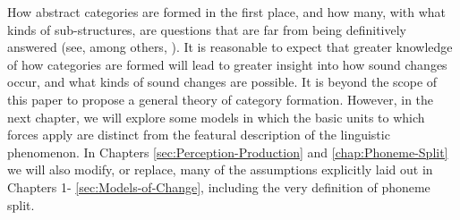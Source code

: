 How abstract categories are formed in the first place, and how many,
with what kinds of sub-structures, are questions that are far from
being definitively answered (see, among others, \citet{Peperkamp2006,dillon2013single,feldman2009learning,mcmurray2011information,goldsmith2009learning}).
It is reasonable to expect that greater knowledge of how categories
are formed will lead to greater insight into how sound changes occur,
and what kinds of sound changes are possible. It is beyond the scope
of this paper to propose a general theory of category formation. However,
in the next chapter, we will explore some models in which the basic
units to which forces apply are distinct from the featural description
of the linguistic phenomenon. In Chapters \ref{sec:Perception-Production}
and \ref{chap:Phoneme-Split} we will also modify, or replace, many
of the assumptions explicitly laid out in Chapters 1- \ref{sec:Models-of-Change},
including the very definition of phoneme split.
